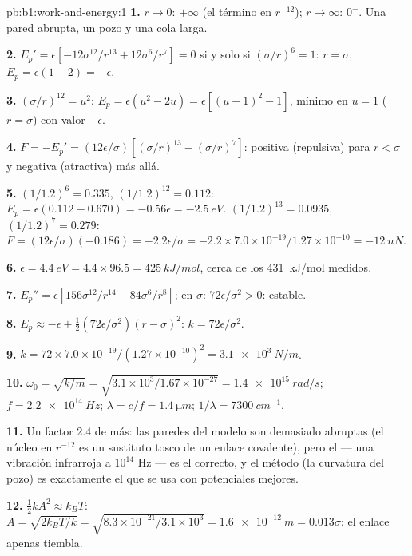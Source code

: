 \begin{solution}{pb:b1:work-and-energy:1}
\textbf{1.} $r \to 0$: $+\infty$ (el término en $r^{-12}$); $r \to \infty$:
$0^-$. Una pared abrupta, un pozo y una cola larga.

\textbf{2.} $E_p' = \epsilon[-12\sigma^{12}/r^{13} + 12\sigma^6/r^7] = 0$ si y
solo si $(\sigma/r)^6 = 1$: $r = \sigma$, $E_p = \epsilon(1 - 2) = -\epsilon$.

\textbf{3.} $(\sigma/r)^{12} = u^2$: $E_p = \epsilon(u^2 - 2u) = \epsilon[(u - 1)^2
- 1]$, mínimo en $u = 1$ ($r = \sigma$) con valor $-\epsilon$.

\textbf{4.} $F = -E_p' = (12\epsilon/\sigma)[(\sigma/r)^{13} - (\sigma/r)^7]$:
positiva (repulsiva) para $r < \sigma$ y negativa (atractiva) más allá.

\textbf{5.} $(1/1.2)^6 = 0.335$, $(1/1.2)^{12} = 0.112$: $E_p = \epsilon(0.112
- 0.670) = -0.56\epsilon = \qty{-2.5}{eV}$. $(1/1.2)^{13} = 0.0935$,
$(1/1.2)^7 = 0.279$: $F = (12\epsilon/\sigma)(-0.186) = -2.2\epsilon/\sigma =
-2.2 \times 7.0\times10^{-19}/1.27\times10^{-10} = \qty{-12}{nN}$.

\textbf{6.} $\epsilon = \qty{4.4}{eV} = 4.4 \times 96.5 = \qty{425}{kJ/mol}$,
cerca de los \qty{431}{kJ/mol} medidos.

\textbf{7.} $E_p'' = \epsilon[156\sigma^{12}/r^{14} - 84\sigma^6/r^8]$; en
$\sigma$: $72\epsilon/\sigma^2 > 0$: estable.

\textbf{8.} $E_p \approx -\epsilon + \tfrac12(72\epsilon/\sigma^2)(r - \sigma)^2$:
$k = 72\epsilon/\sigma^2$.

\textbf{9.} $k = 72 \times 7.0\times10^{-19}/(1.27\times10^{-10})^2 =
\qty{3.1e3}{N/m}$.

\textbf{10.} $\omega_0 = \sqrt{k/m} = \sqrt{3.1\times10^3/1.67\times10^{-27}} =
\qty{1.4e15}{rad/s}$; $f = \qty{2.2e14}{Hz}$; $\lambda = c/f = \qty{1.4}{\micro m}$;
$1/\lambda = \qty{7300}{cm^{-1}}$.

\textbf{11.} Un factor $2.4$ de más: las paredes del modelo son demasiado
abruptas (el núcleo en $r^{-12}$ es un sustituto tosco de un enlace
covalente), pero el  --- una vibración infrarroja a
$10^{14}$ Hz --- es el correcto, y el método (la curvatura del pozo) es
exactamente el que se usa con potenciales mejores.

\textbf{12.} $\tfrac12 kA^2 \approx k_BT$: $A = \sqrt{2k_BT/k} = \sqrt{8.3\times
10^{-21}/3.1\times10^3} = \qty{1.6e-12}{m} = 0.013\sigma$: el enlace apenas
tiembla.


\end{solution}
